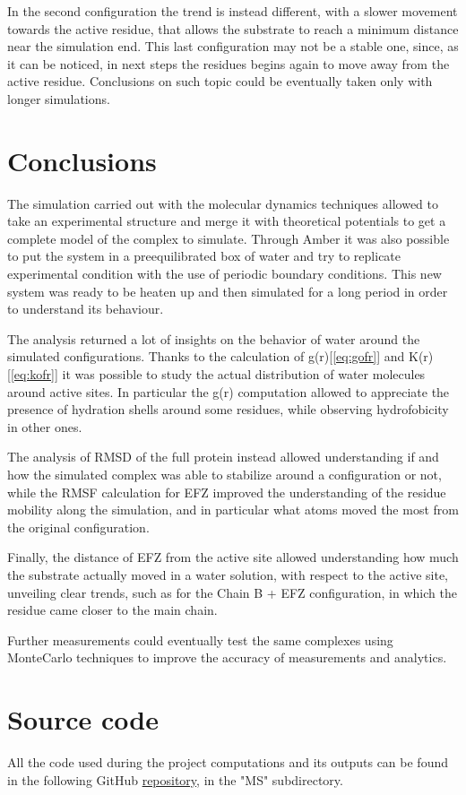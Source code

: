 \documentclass[12pt]{article}
\begin{document}
In the second configuration the trend is instead different, with a slower movement towards the active residue, that allows the substrate to reach a minimum distance near the simulation end. This last configuration may not be a stable one, since, as it can be noticed, in next steps the residues begins again to move away from the active residue. Conclusions on such topic could be eventually taken only with longer simulations.
\section{Conclusions}
The simulation carried out with the molecular dynamics techniques allowed to take an  experimental structure and merge it with theoretical potentials to get a complete model of the complex to simulate. Through Amber\cite{Amber} it was also possible to put the system in a preequilibrated box of water and try to replicate experimental condition with the use of periodic boundary conditions. This new system was ready to be heaten up and then simulated for a long period in order to understand its behaviour.

The analysis returned a lot of insights on the behavior of water around the simulated configurations. Thanks to the calculation of g(r)[\ref{eq:gofr}] and K(r)[\ref{eq:kofr}] it was possible to study the actual distribution of water molecules around active sites. In particular the g(r) computation allowed to appreciate the presence of hydration shells around some residues, while observing hydrofobicity in other ones. 

The analysis of RMSD of the full protein instead allowed understanding if and how the simulated complex was able to stabilize around a configuration or not, while the RMSF calculation for EFZ improved the understanding of the residue mobility along the simulation, and in particular what atoms moved the most from the original configuration.

Finally, the distance of EFZ from the active site allowed understanding how much the substrate actually moved in a water solution, with respect to the active site, unveiling clear trends, such as for the Chain B + EFZ configuration, in which the residue came closer to the main chain. 

Further measurements could eventually test the same complexes using MonteCarlo techniques to improve the accuracy of measurements and analytics.
\section{Source code}
All the code used during the project computations and its outputs can be found in the following GitHub \href{https://github.com/Confizolo/PoDProjects}{repository}, in the "MS" subdirectory.
\end{document}
